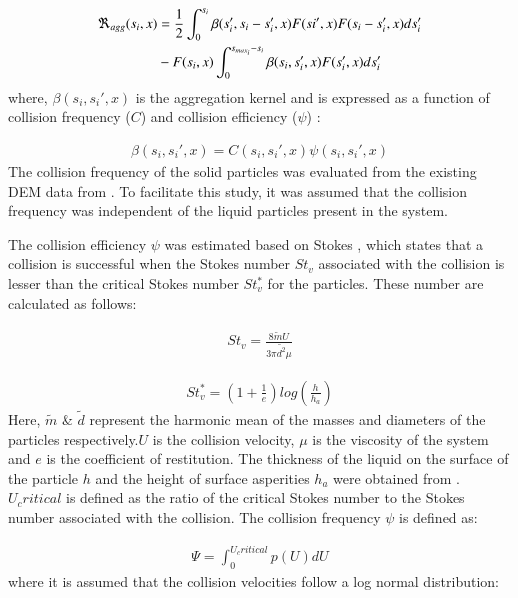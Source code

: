 \documentclass[preprint,10pt,authoryear,review]{elsarticle}
\begin{document}
\begin{linenumbers}
\begin{align}
\Re_{agg}(s_i,x)&= \frac{1}{2}\int _0^{s_i} 
\beta(s_i',s_i-s_i',x)F(si',x)F(s_i-s_i',x)ds_i'\notag\\ 
&- F(s_i,x)\int _0^{s_{max_i}-s_i} 
\beta(s_i,s_i',x)F(s_i',x)ds_i'
\label{eqn:mthds_R_agg}
\end{align}
where, $\beta(s_i, s_i',x)$ is the aggregation kernel and is expressed as a 
function of collision frequency ($C$) and collision efficiency ($\psi$) 
\citep{Barrasso2015ces}: 

\begin{align}
\beta(s_i,s_i',x)=C(s_i,s_i',x)\psi(s_i,s_i',x)
\label{eqn:mthds_pbm_beta_kernal}
\end{align}
The collision frequency of the solid particles was evaluated from the existing 
DEM data from \citep{Sampat2018}. To facilitate this study, it was assumed that
the collision frequency was independent of the liquid particles present in the 
system.

The collision efficiency $\psi$ was estimated based on Stokes , which 
states that a collision is successful when the Stokes number $St_v$ associated 
with the collision is lesser than the critical Stokes number ${St^*_v}$ for the 
particles. These number are calculated as follows:

\begin{align}
St_v=\frac{8\tilde{m}U}{3\pi\tilde{d^2}\mu}
\label{eqn:mthds_pbm_agg_Stnum}
\end{align}

\begin{align}
St^*_v=\left(1+\frac{1}{e}\right)log\left(\frac{h}{h_a}\right)
\label{eqn:mthds_pbm_agg_cricSt}
\end{align}
Here, $\tilde{m}$ \& $\tilde{d}$ represent the harmonic mean of the masses and 
diameters of the particles respectively.$U$ is the collision velocity, $\mu$ is the 
viscosity of the system and $e$ is the coefficient of restitution. The thickness of 
the liquid on the surface of the particle $h$ and the height of surface asperities 
$h_a$ were obtained from \citep{Barrasso2015ces}. $U_critical$ is defined as the 
ratio of the critical Stokes number to the Stokes number associated with the collision. 
The collision frequency $\psi$ is defined as:

\begin{align}
\Psi = \int_0^{U_critical} p(U)dU
\label{eqn:mthds_pbm_agg_psi}
\end{align}
where it is assumed that the collision velocities follow a log normal distribution:



\end{linenumbers}
\end{document}
